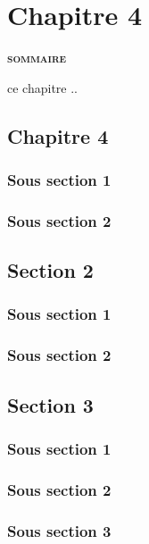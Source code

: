 \chapter{Chapitre 4}
\label{chap:chap4}

\vspace{20pt}
\begin{center} {\scshape\bfseries sommaire} \end{center}
\startcontents[chapters]

\smash{\rule{\textwidth}{.4pt}}
\smash{\rule{\textwidth}{.4pt}}

\vspace{20pt}

 ce chapitre ..

\section{Chapitre 4}

\subsection{Sous section 1}
\subsection{Sous section 2}

\section{Section 2}

\subsection{Sous section 1}
\subsection{Sous section 2}

\section{Section 3}

\subsection{Sous section 1}
\subsection{Sous section 2}
\subsection{Sous section 3}
